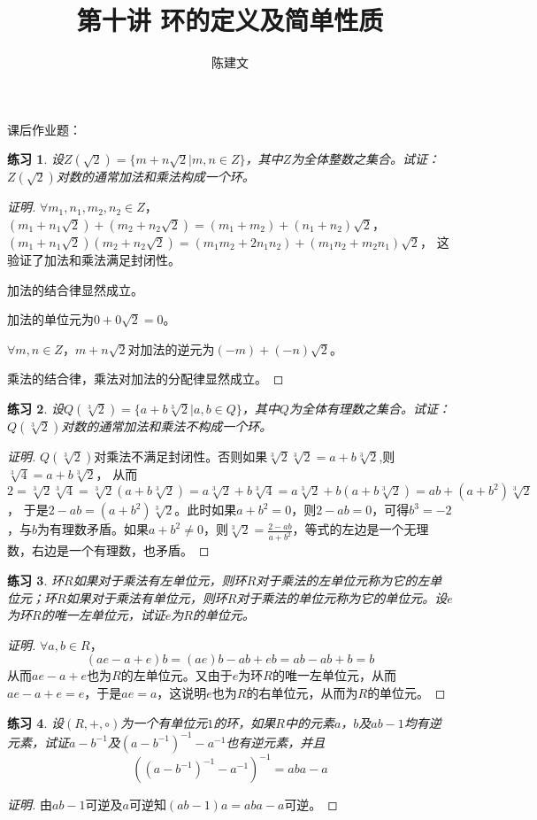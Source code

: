 \documentclass{article}
\newtheorem{Exercise}{练习}
\begin{document}
\begin{CJK*}{UTF8}{gbsn}
  \title{第十讲 环的定义及简单性质}
  \author{陈建文}
  \maketitle

课后作业题：
\begin{Exercise}
  设$Z(\sqrt{2})=\{m+n\sqrt{2}|m,n\in Z\}$，其中$Z$为全体整数之集合。试证：$Z(\sqrt{2})$对数的通常加法和乘法构成一个环。
\end{Exercise}
\begin{proof}[证明]
  $\forall m_1,n_1,m_2,n_2\in Z$，$(m_1+n_1\sqrt{2})+(m_2+n_2\sqrt{2})=(m_1+m_2)+(n_1+n_2)\sqrt{2}$，$(m_1+n_1\sqrt{2})(m_2+n_2\sqrt{2})=(m_1m_2+2n_1n_2)+(m_1n_2+m_2n_1)\sqrt{2}$，
  这验证了加法和乘法满足封闭性。

  加法的结合律显然成立。

  加法的单位元为$0+0\sqrt{2}=0$。

  $\forall m,n\in Z$，$m+n\sqrt{2}$对加法的逆元为$(-m)+(-n)\sqrt{2}$。

  乘法的结合律，乘法对加法的分配律显然成立。
\end{proof}
\begin{Exercise}
  设$Q(\sqrt[3]{2})=\{a+b\sqrt[3]{2}|a,b\in Q\}$，其中$Q$为全体有理数之集合。试证：$Q(\sqrt[3]{2})$对数的通常加法和乘法不构成一个环。
\end{Exercise}
\begin{proof}[证明]
  $Q(\sqrt[3]{2})$对乘法不满足封闭性。否则如果$\sqrt[3]{2}\sqrt[3]{2}=a+b\sqrt[3]{2}$,则$\sqrt[3]{4}=a+b\sqrt[3]{2}$，
  从而$2=\sqrt[3]{2}\sqrt[3]{4}=\sqrt[3]{2}(a+b\sqrt[3]{2})=a\sqrt[3]{2}+b\sqrt[3]{4}=a\sqrt[3]{2}+b(a+b\sqrt[3]{2})=ab+(a+b^2)\sqrt[3]{2}$，
  于是$2-ab=(a+b^2)\sqrt[3]{2}$。此时如果$a+b^2=0$，则$2-ab=0$，可得$b^3=-2$，与$b$为有理数矛盾。如果$a+b^2\neq 0$，则$\sqrt[3]{2}=\frac{2-ab}{a+b^2}$，等式的左边是一个无理数，右边是一个有理数，也矛盾。
\end{proof}
\begin{Exercise}
  环$R$如果对于乘法有左单位元，则环$R$对于乘法的左单位元称为它的左单位元；环$R$如果对于乘法有单位元，则环$R$对于乘法的单位元称为它的单位元。设$e$为环$R$的唯一左单位元，试证$e$为$R$的单位元。
\end{Exercise}
\begin{proof}[证明]
  $\forall a,b\in R$，
  \[(ae-a+e)b=(ae)b-ab+eb=ab-ab+b=b\]
  从而$ae-a+e$也为$R$的左单位元。又由于$e$为环$R$的唯一左单位元，从而$ae-a+e=e$，于是$ae=a$，这说明$e$也为$R$的右单位元，从而为$R$的单位元。
\end{proof}
\begin{Exercise}
  设$(R,+,\circ)$为一个有单位元$1$的环，如果$R$中的元素$a$，$b$及$ab-1$均有逆元素，试证$a-b^{-1}$及$(a-b^{-1})^{-1}-a^{-1}$也有逆元素，并且
\[((a-b^{-1})^{-1}-a^{-1})^{-1}=aba-a\]
\end{Exercise}
\begin{proof}[证明]
  由$ab-1$可逆及$a$可逆知$(ab-1)a=aba-a$可逆。


\end{proof}
\end{CJK*}
\end{document}
